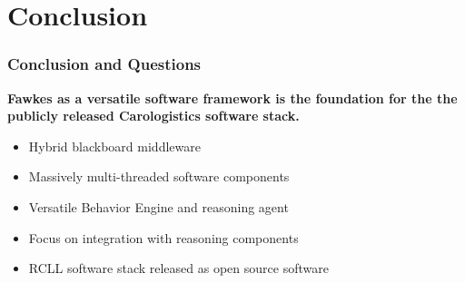 \section{Conclusion}
\begin{frame}
  \frametitle{Conclusion and Questions}

  \begin{block}{}
    \centering\bfseries
    Fawkes as a versatile software framework is the foundation for the
    the publicly released Carologistics software stack.
  \end{block}

  \bigskip


  \begin{itemize}
  \item Hybrid blackboard middleware
  \item Massively multi-threaded software components
  \item Versatile Behavior Engine and reasoning agent
  \item Focus on integration with reasoning components
  \item RCLL software stack released as open source software
  \end{itemize}

  \bigskip

\end{frame}


